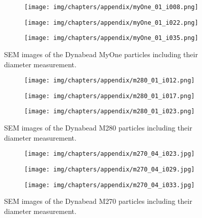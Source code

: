 \begin{figure}[htb]
	\centering
	\begin{subfigure}[b]{0.48\textwidth}
		\texttt{[image: img/chapters/appendix/myOne\_01\_i008.png]}
		\caption{}
	\end{subfigure}
	\hfill
	\begin{subfigure}[b]{0.48\textwidth}
		\texttt{[image: img/chapters/appendix/myOne\_01\_i022.png]}
		\caption{}
	\end{subfigure}
	\hfill
	\begin{subfigure}[b]{0.48\textwidth}
		\texttt{[image: img/chapters/appendix/myOne\_01\_i035.png]}
		\caption{}
	\end{subfigure}
	\caption[SEM images for Dynabead MyOne particles including measurements]{SEM images of the Dynabead MyOne particles including their diameter measurement.}
\end{figure}

\begin{figure}[htb]
	\centering
	\begin{subfigure}[b]{0.48\textwidth}
		\texttt{[image: img/chapters/appendix/m280\_01\_i012.png]}
		\caption{}
	\end{subfigure}
	\hfill
	\begin{subfigure}[b]{0.48\textwidth}
		\texttt{[image: img/chapters/appendix/m280\_01\_i017.png]}
		\caption{}
	\end{subfigure}
	\hfill
	\begin{subfigure}[b]{0.48\textwidth}
		\texttt{[image: img/chapters/appendix/m280\_01\_i023.png]}
		\caption{}
	\end{subfigure}
	\caption[SEM images for Dynabead M280 particles including measurements]{SEM images of the Dynabead M280 particles including their diameter measurement.}
\end{figure}

\begin{figure}[htb]
	\centering
	\begin{subfigure}[b]{0.48\textwidth}
		\texttt{[image: img/chapters/appendix/m270\_04\_i023.jpg]}
		\caption{}
	\end{subfigure}
	\hfill
	\begin{subfigure}[b]{0.48\textwidth}
		\texttt{[image: img/chapters/appendix/m270\_04\_i029.jpg]}
		\caption{}
	\end{subfigure}
	\hfill
	\begin{subfigure}[b]{0.48\textwidth}
		\texttt{[image: img/chapters/appendix/m270\_04\_i033.jpg]}
		\caption{}
	\end{subfigure}
	\caption[SEM images for Dynabead M270 particles including measurements]{SEM images of the Dynabead M270 particles including their diameter measurement.}
\end{figure}


